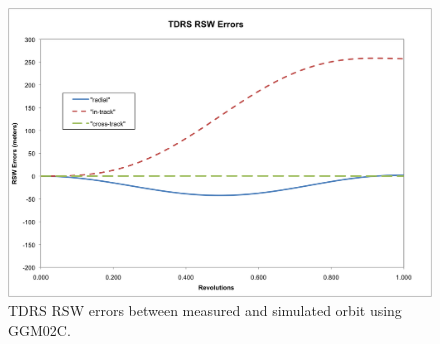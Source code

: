\begin{description}
\begin{figure}
\begin{center}
\includegraphics [width=7.0in]{figs/tdrs/tdrs_err.png}
\end{center}
\caption{TDRS RSW errors between measured and simulated orbit using GGM02C.}
\label{fig:5}
\end{figure}

\clearpage
\pagebreak
\end{description}

